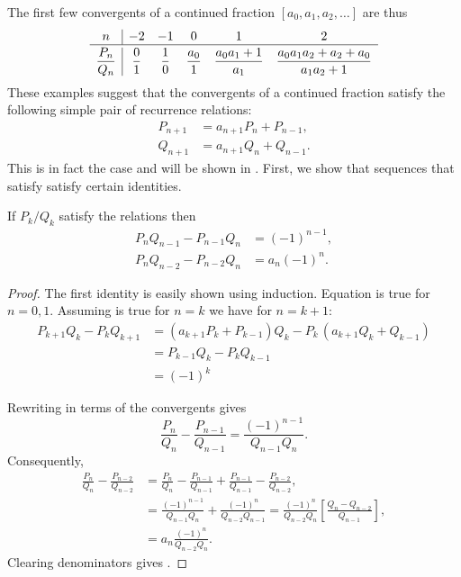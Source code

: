 The first few convergents of a continued fraction
$[a_0, a_1, a_2, \ldots]$ are thus
\[
\begin{array}{c|ccccc}
    n & -2 & -1 & 0 & 1 & 2 \\ \hline\noalign{\vspace{2pt}}
    \displaystyle\frac{P_n}{Q_n} & \displaystyle\frac{0}{1}& \displaystyle\frac{1}{0}&
    \displaystyle\frac{a_0}{1}& \displaystyle\frac{a_0 a_1 + 1}{a_1} &
    \displaystyle\frac{a_0 a_1 a_2 + a_2 + a_0}{a_1 a_2 + 1}
\end{array}
\]
These examples suggest that the convergents of a continued fraction
satisfy the following simple pair of recurrence relations:
\begin{equation}
\label{CFRecurrence:Eq}
 \begin{aligned}
  P_{n+1} &= a_{n+1} P_n + P_{n-1},\\
  Q_{n+1} &= a_{n+1} Q_n + Q_{n-1}.
 \end{aligned}
\end{equation}
This is in fact the case and will be shown in
. First, we show that sequences that
satisfy  satisfy certain identities.

\begin{proposition}\label{CF:Identities:Prop}
If $P_k/Q_k$ satisfy the relations  then 
\begin{align}
  P_n Q_{n-1} - P_{n-1} Q_n &= (-1)^{n-1}, \label{CFUnitIdentity:Eq} \\
  P_n Q_{n-2} - P_{n-2} Q_n &= a_n(-1)^{n}. \label{CF:2Dif:Identity:Eq} 
\end{align}
\end{proposition}

\begin{proof}
The first identity is easily shown using induction.  Equation
 is true for $n= 0, 1$.  Assuming
 is true for $n = k$ we have for $n = k+1$: 
\[
\begin{aligned}
  P_{k+1} Q_k - P_k Q_{k+1}
    & =(a_{k+1} P_k + P_{k-1}) Q_k - P_k \,(a_{k+1} Q_k + Q_{k-1})\\
    &= P_{k-1} Q_k - P_k Q_{k-1} \\
    &= (-1)^{k}
\end{aligned}
\]

Rewriting  in terms of the convergents gives
\[
\frac{P_n}{Q_n} - \frac{P_{n-1}}{Q_{n-1}} = \frac{(-1)^{n-1}}{Q_{n-1}
Q_n}.
\]
Consequently,
\[
\begin{aligned}
\frac{P_n}{Q_n} - \frac{P_{n-2}}{Q_{n-2}} &= 
 \frac{P_n}{Q_n} - \frac{P_{n-1}}{Q_{n-1}} + 
 \frac{P_{n-1}}{Q_{n-1}} - \frac{P_{n-2}}{Q_{n-2}}, \\
& = \frac{(-1)^{n-1}}{Q_{n-1}Q_n} + \frac{(-1)^{n}}{Q_{n-2}Q_{n-1}}
  = \frac{(-1)^{n}}{Q_{n-2} Q_n}\left[ \frac{Q_n - Q_{n-2}}{Q_{n-1}}
     \right], \\
 & = a_n \frac{(-1)^n}{Q_{n-2} Q_n}.
\end{aligned}\]
Clearing denominators gives .
\end{proof}

